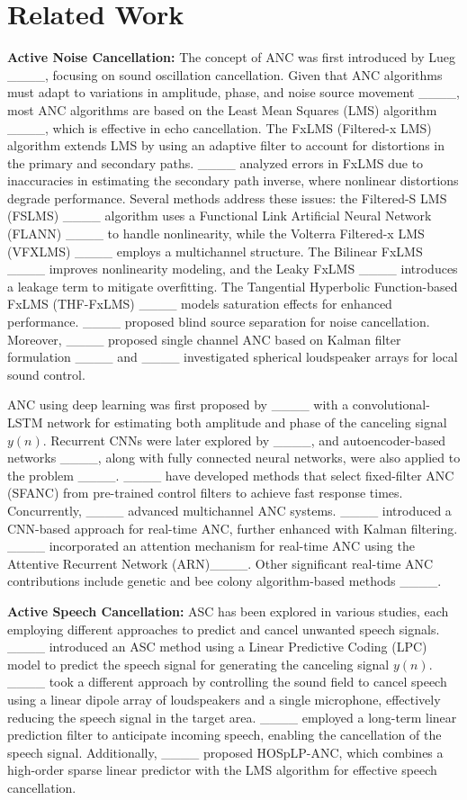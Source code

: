 \section{Related Work}
\textbf{Active Noise Cancellation:} 
The concept of ANC was first introduced by Lueg ____, focusing on sound oscillation cancellation. Given that ANC algorithms must adapt to variations in amplitude, phase, and noise source movement ____, most ANC algorithms are based on the Least Mean Squares (LMS) algorithm ____, which is effective in echo cancellation. The FxLMS (Filtered-x LMS) algorithm extends LMS by using an adaptive filter to account for distortions in the primary and secondary paths. ____ analyzed errors in FxLMS due to inaccuracies in estimating the secondary path inverse, where nonlinear distortions degrade performance. Several methods address these issues: the Filtered-S LMS (FSLMS) ____ algorithm uses a Functional Link Artificial Neural Network (FLANN) ____ to handle nonlinearity, while the Volterra Filtered-x LMS (VFXLMS) ____ employs a multichannel structure. The Bilinear FxLMS ____ improves nonlinearity modeling, and the Leaky FxLMS ____ introduces a leakage term to mitigate overfitting. The Tangential Hyperbolic Function-based FxLMS (THF-FxLMS) ____ models saturation effects for enhanced performance. ____ proposed blind source separation for noise cancellation. Moreover, ____ proposed single channel ANC based on Kalman filter formulation ____ and ____ investigated spherical loudspeaker arrays for local sound control.

ANC using deep learning was first proposed by ____ with a convolutional-LSTM network for estimating both amplitude and phase of the canceling signal $y(n)$. Recurrent CNNs were later explored by ____, and autoencoder-based networks ____, along with fully connected neural networks, were also applied to the problem ____. ____ have developed methods that select fixed-filter ANC (SFANC) from pre-trained control filters to achieve fast response times. Concurrently, ____ advanced multichannel ANC systems. ____ introduced a CNN-based approach for real-time ANC, further enhanced with Kalman filtering. ____ incorporated an attention mechanism for real-time ANC using the Attentive Recurrent Network (ARN)____. Other significant real-time ANC contributions include genetic and bee colony algorithm-based methods ____.

\textbf{Active Speech Cancellation:}
ASC has been explored in various studies, each employing different approaches to predict and cancel unwanted speech signals. ____ introduced an ASC method using a Linear Predictive Coding (LPC) model to predict the speech signal for generating the canceling signal $y(n)$. ____ took a different approach by controlling the sound field to cancel speech using a linear dipole array of loudspeakers and a single microphone, effectively reducing the speech signal in the target area. ____ employed a long-term linear prediction filter to anticipate incoming speech, enabling the cancellation of the speech signal. Additionally, ____ proposed HOSpLP-ANC, which combines a high-order sparse linear predictor with the LMS algorithm for effective speech cancellation.

